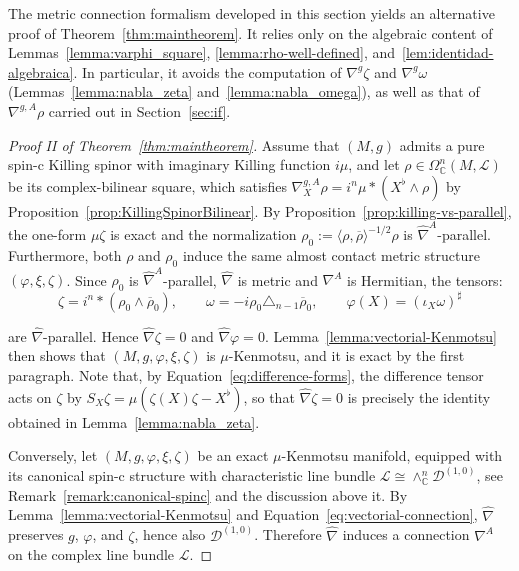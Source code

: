 \documentclass[10pt,a4paper,twoside,reqno]{amsart}
\theoremstyle{plain}
\theoremstyle{definition}
\theoremstyle{remark}
\def\C{\mathbb{C}}
\newcommand{\escal}[1]{\langle#1\rangle}
\begin{document}
\noindent
The metric connection formalism developed in this section yields an alternative proof of Theorem~\ref{thm:maintheorem}. It relies only on the algebraic content of Lemmas~\ref{lemma:varphi_square}, \ref{lemma:rho-well-defined}, and~\ref{lem:identidad-algebraica}. In particular, it avoids the computation of $\nabla^g\zeta$ and $\nabla^g\omega$ (Lemmas~\ref{lemma:nabla_zeta} and~\ref{lemma:nabla_omega}), as well as that of $\nabla^{g,A}\rho$ carried out in Section~\ref{sec:if}.

\begin{proof}[Proof II of Theorem~\ref{thm:maintheorem}]
Assume that $(M,g)$ admits a pure spin-c Killing spinor with imaginary Killing function $i\mu$, and let $\rho\in\Omega^n_\C(M,\mathcal{L})$ be its complex-bilinear square, which satisfies $\nabla^{g,A}_X\rho=i^n\mu*(X^\flat\wedge\rho)$ by Proposition~\ref{prop:KillingSpinorBilinear}. By Proposition~\ref{prop:killing-vs-parallel}, the one-form $\mu\zeta$ is exact and the normalization $\rho_0:=\escal{\rho,\overline{\rho}}^{-1/2}\rho$ is $\hat\nabla^A$-parallel. Furthermore, both $\rho$ and $\rho_0$ induce the same almost contact metric structure $(\varphi,\xi,\zeta)$. Since $\rho_0$ is $\hat\nabla^A$-parallel, $\hat\nabla$ is metric and $\nabla^A$ is Hermitian, the tensors:
\begin{equation*}
    \zeta= i^n *(\rho_0\wedge\overline{\rho}_0),\qquad \omega= -i \rho_0\triangle_{n-1}\overline{\rho}_0,\qquad \varphi(X)=(\iota_X\omega)^\sharp
\end{equation*}

\noindent
are $\hat\nabla$-parallel. Hence $\hat\nabla\zeta=0$ and $\hat\nabla\varphi=0$. Lemma~\ref{lemma:vectorial-Kenmotsu} then shows that $(M,g,\varphi,\xi,\zeta)$ is $\mu$-Kenmotsu, and it is exact by the first paragraph. Note that, by Equation~\eqref{eq:difference-forms}, the difference tensor acts on $\zeta$ by $S_X\zeta=\mu(\zeta(X)\zeta-X^\flat)$, so that $\hat\nabla\zeta=0$ is precisely the identity obtained in Lemma~\ref{lemma:nabla_zeta}.\medskip

\noindent
Conversely, let $(M,g,\varphi,\xi,\zeta)$ be an exact $\mu$-Kenmotsu manifold, equipped with its canonical spin-c structure with characteristic line bundle $\mathcal{L}\cong\wedge^n_{\mathbb{C}}\mathcal{D}^{(1,0)}$, see Remark~\ref{remark:canonical-spinc} and the discussion above it. By Lemma~\ref{lemma:vectorial-Kenmotsu} and Equation~\eqref{eq:vectorial-connection}, $\hat\nabla$ preserves $g$, $\varphi$, and $\zeta$, hence also $\mathcal{D}^{(1,0)}$. Therefore $\hat{\nabla}$ induces a connection $\nabla^A$ on the complex line bundle $\mathcal{L}$.\medskip


\end{proof}
\end{document}
